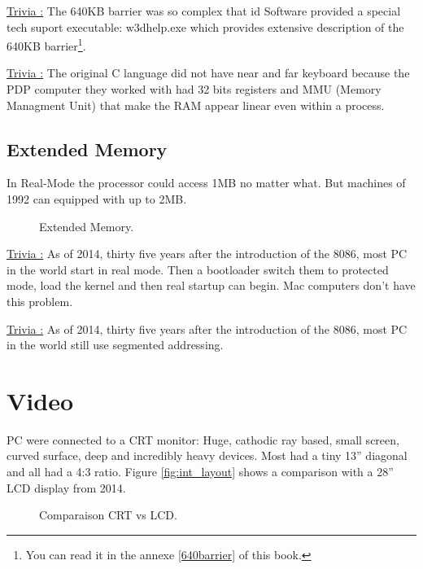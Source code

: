 \documentclass[book.tex]{subfiles}
\begin{document}
\bigskip

{\underline{Trivia :}} The 640KB barrier was so complex that id Software provided a special tech suport executable: w3dhelp.exe which provides extensive description of the 640KB barrier\footnote{You can read it in the annexe \ref{640barrier} of this book.}.

\bigskip

{\underline{Trivia :}} The original C language did not have near and far keyboard because the PDP computer they worked with had 32 bits registers and MMU (Memory Managment Unit) that make the RAM appear linear even within a process.




  \subsection{Extended Memory}

In Real-Mode the processor could access 1MB no matter what. But machines of 1992 can equipped with up to 2MB. 

  \begin{figure}[H]
\centering
 
 \caption{Extended Memory.}
 \end{figure}


{\underline{Trivia :}}  As of 2014, thirty five years after the introduction of the 8086, most PC in the world start in  real mode. Then a bootloader switch them to protected mode, load the kernel and then real startup can begin. Mac computers don’t have this problem.

\bigskip

{\underline{Trivia :}}  As of 2014, thirty five years after the introduction of the 8086, most PC in the world still use segmented addressing.




\section{Video}

PC were connected to a CRT monitor: Huge, cathodic ray based, small screen, curved surface, deep and incredibly heavy devices. Most had a tiny 13” diagonal and all had a 4:3 ratio. Figure \ref{fig:int_layout} shows a comparison with a 28” LCD display from 2014.

  \begin{figure}[H]
\centering
 
 \caption{Comparaison CRT vs LCD.}\label{fig:lcd_vs_crt}
 \end{figure}
\end{document}
